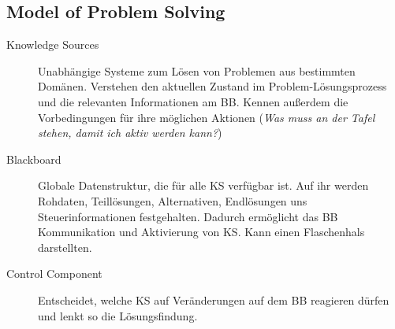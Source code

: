 \documentclass{article} %
\begin{document}
	\subsection{Model of Problem Solving}
	\begin{description}
		\item[Knowledge Sources] Unabhängige Systeme zum Lösen von Problemen aus bestimmten Domänen.
		Verstehen den aktuellen Zustand im Problem-Lösungsprozess und die relevanten Informationen am BB.
		Kennen außerdem die Vorbedingungen für ihre möglichen Aktionen (\emph{Was muss an der Tafel stehen, damit ich aktiv werden kann?})
		\item[Blackboard] Globale Datenstruktur, die für alle KS verfügbar ist.
		Auf ihr werden Rohdaten, Teillösungen, Alternativen, Endlösungen uns Steuerinformationen festgehalten.
		Dadurch ermöglicht das BB Kommunikation und Aktivierung von KS.
		Kann einen Flaschenhals darstellten.
		\item[Control Component] Entscheidet, welche KS auf Veränderungen auf dem BB reagieren dürfen und lenkt so die Lösungsfindung.
	\end{description}
\end{document}
